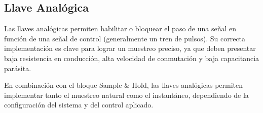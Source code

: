 \subsection{Llave Analógica}
Las llaves analógicas permiten habilitar o bloquear el paso de una señal en función 
de una señal de control (generalmente un tren de pulsos).
Su correcta implementación es clave para lograr un muestreo preciso,
ya que deben presentar baja resistencia en conducción, alta velocidad
de conmutación y baja capacitancia parásita.

En combinación con el bloque Sample \& Hold, las llaves analógicas permiten
implementar tanto el muestreo natural como el instantáneo, 
dependiendo de la configuración del sistema y del control aplicado.

